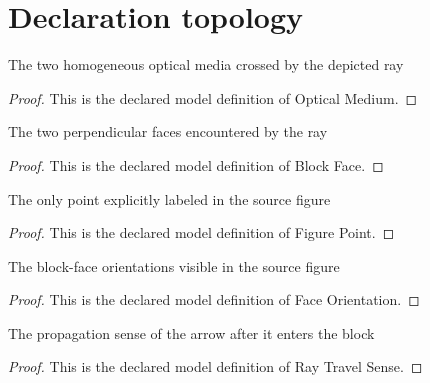 \section{Declaration topology}
\begin{definition}
  \label{def:physics:phyx-mini-0096:phyxminiproblems-problemphyxmini0096-opticalmedium}
  The two homogeneous optical media crossed by the depicted ray
\end{definition}
\begin{proof}
  This is the declared model definition of Optical Medium.
\end{proof}
\begin{definition}
  \label{def:physics:phyx-mini-0096:phyxminiproblems-problemphyxmini0096-blockface}
  The two perpendicular faces encountered by the ray
\end{definition}
\begin{proof}
  This is the declared model definition of Block Face.
\end{proof}
\begin{definition}
  \label{def:physics:phyx-mini-0096:phyxminiproblems-problemphyxmini0096-figurepoint}
  The only point explicitly labeled in the source figure
\end{definition}
\begin{proof}
  This is the declared model definition of Figure Point.
\end{proof}
\begin{definition}
  \label{def:physics:phyx-mini-0096:phyxminiproblems-problemphyxmini0096-faceorientation}
  The block-face orientations visible in the source figure
\end{definition}
\begin{proof}
  This is the declared model definition of Face Orientation.
\end{proof}
\begin{definition}
  \label{def:physics:phyx-mini-0096:phyxminiproblems-problemphyxmini0096-raytravelsense}
  The propagation sense of the arrow after it enters the block
\end{definition}
\begin{proof}
  This is the declared model definition of Ray Travel Sense.
\end{proof}
